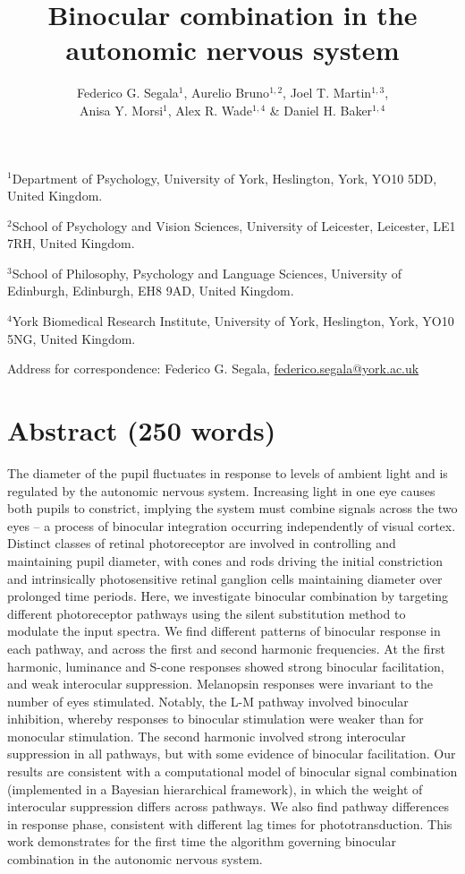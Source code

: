 \documentclass[
]{article}
\title{Binocular combination in the autonomic nervous system}
\author{Federico G. Segala\(^1\), Aurelio Bruno\(^{1,2}\), Joel T. Martin\(^{1,3}\),\\
Anisa Y. Morsi\(^1\), Alex R. Wade\(^{1,4}\) \& Daniel H. Baker\(^{1,4}\)}
\date{}
\begin{document}
\maketitle

\(^1\)Department of Psychology, University of York, Heslington, York, YO10 5DD, United Kingdom.

\(^2\)School of Psychology and Vision Sciences, University of Leicester, Leicester, LE1 7RH, United Kingdom.

\(^3\)School of Philosophy, Psychology and Language Sciences, University of Edinburgh, Edinburgh, EH8 9AD, United Kingdom.

\(^4\)York Biomedical Research Institute, University of York, Heslington, York, YO10 5NG, United Kingdom.

Address for correspondence: Federico G. Segala, \url{federico.segala@york.ac.uk}

\hypertarget{abstract-250-words}{%
\section{Abstract (250 words)}\label{abstract-250-words}}

The diameter of the pupil fluctuates in response to levels of ambient light and is regulated by the autonomic nervous system. Increasing light in one eye causes both pupils to constrict, implying the system must combine signals across the two eyes -- a process of binocular integration occurring independently of visual cortex. Distinct classes of retinal photoreceptor are involved in controlling and maintaining pupil diameter, with cones and rods driving the initial constriction and intrinsically photosensitive retinal ganglion cells maintaining diameter over prolonged time periods. Here, we investigate binocular combination by targeting different photoreceptor pathways using the silent substitution method to modulate the input spectra. We find different patterns of binocular response in each pathway, and across the first and second harmonic frequencies. At the first harmonic, luminance and S-cone responses showed strong binocular facilitation, and weak interocular suppression. Melanopsin responses were invariant to the number of eyes stimulated. Notably, the L-M pathway involved binocular inhibition, whereby responses to binocular stimulation were weaker than for monocular stimulation. The second harmonic involved strong interocular suppression in all pathways, but with some evidence of binocular facilitation. Our results are consistent with a computational model of binocular signal combination (implemented in a Bayesian hierarchical framework), in which the weight of interocular suppression differs across pathways. We also find pathway differences in response phase, consistent with different lag times for phototransduction. This work demonstrates for the first time the algorithm governing binocular combination in the autonomic nervous system.
\end{document}

